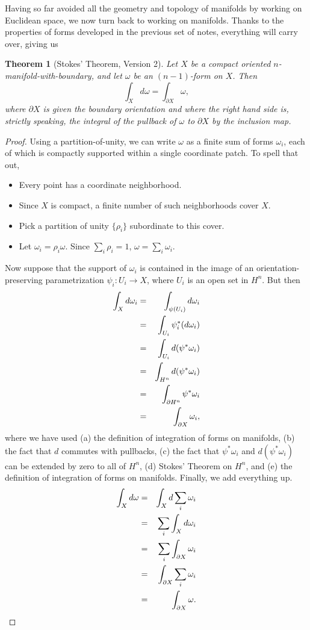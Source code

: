 \documentclass[12pt]{amsbook}
\newcommand{\be}{\begin{equation}}
\newcommand{\ee}{\end{equation}}
\newtheorem{thm}{Theorem}[section]
\theoremstyle{definition}
\begin{document}
Having so far avoided all the geometry and topology of manifolds by working on 
Euclidean space, we now turn back to working on manifolds. Thanks to the 
properties of forms developed in the previous set of notes, everything will
carry over, giving us

\begin{thm}[Stokes' Theorem, Version 2] Let $X$ be a compact oriented
$n$-manifold-with-boundary, and let $\omega$ be an $(n-1)$-form on $X$. Then
\be \label{Stokes-2} \int_X d\omega = \int_{\partial X} \omega, \ee
where $\partial X$ is given the boundary orientation and where the 
right hand side is, strictly 
speaking, the integral of the pullback of $\omega$ to $\partial X$ 
by the inclusion map. 
\end{thm}

\begin{proof} Using a partition-of-unity, we can write $\omega$ as a finite 
sum of forms $\omega_i$, each of which is compactly supported within a single
coordinate patch.  To spell that out, 
\begin{itemize}
\item Every point has a coordinate neighborhood. 
\item Since $X$ is compact, a finite number of such neighborhoods cover $X$. 
\item Pick a partition of unity $\{ \rho_i\}$ subordinate to this cover. 
\item Let $\omega_i = \rho_i \omega$. Since $\sum_i \rho_i=1$,  
$\omega=\sum_i \omega_i$. 
\end{itemize}

Now suppose that the support of $\omega_i$ is contained in the image of 
an orientation-preserving  parametrization $\psi_i: U_i \to X$, 
where $U_i$ is an open set in $H^n$. But then
\begin{eqnarray}
 \int_X d \omega_i &=& \int_{\psi(U_i)} d\omega_i \cr 
&=& 
\int_{U_i} \psi_i^*(d\omega_i) \cr 
& = & \int_{U_i} d(\psi^*\omega_i) \cr 
& = & \int_{H^{n}} d(\psi^*\omega_i) \cr
& = & \int_{\partial H^n} \psi^*\omega_i \cr 
& = & \int_{\partial X} \omega_i,
\end{eqnarray}
where we have used (a) the definition of integration of forms on manifolds,
(b) the fact that $d$ commutes with pullbacks, (c) the fact that 
$\psi^* \omega_i$ and 
$d(\psi^* \omega_i)$ can be extended by zero to all of $H^n$, (d)
Stokes' Theorem on $H^n$, and (e) the definition of integration of forms on
manifolds. Finally, we add everything up.  
\begin{eqnarray}
\int_X d \omega & = & \int_X d \sum_i \omega_i  \cr 
& = & \sum_i \int_X d\omega_i \cr 
& = & \sum_i \int_{\partial X} \omega_i \cr 
& = & \int_{\partial X} \sum_i \omega_i \cr & =&  \int_{\partial X}\omega.
\end{eqnarray}
\end{proof}
\end{document}
